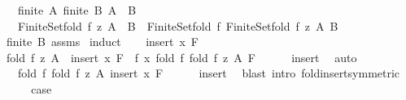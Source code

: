\begin{isabellebody}
\ \ \ {\isachardoublequoteopen}finite\ A{\isachardoublequoteclose}\ {\isachardoublequoteopen}finite\ B{\isachardoublequoteclose}\ {\isachardoublequoteopen}A\ {\isasyminter}\ B\ {\isacharequal}{\kern0pt}\ {\isacharbraceleft}{\kern0pt}{\isacharbraceright}{\kern0pt}{\isachardoublequoteclose}\isanewline
\ \ \ {\isachardoublequoteopen}Finite{\isacharunderscore}{\kern0pt}Set{\isachardot}{\kern0pt}fold\ f\ z\ {\isacharparenleft}{\kern0pt}A\ {\isasymunion}\ B{\isacharparenright}{\kern0pt}\ {\isacharequal}{\kern0pt}\ Finite{\isacharunderscore}{\kern0pt}Set{\isachardot}{\kern0pt}fold\ f\ {\isacharparenleft}{\kern0pt}Finite{\isacharunderscore}{\kern0pt}Set{\isachardot}{\kern0pt}fold\ f\ z\ A{\isacharparenright}{\kern0pt}\ B{\isachardoublequoteclose}\isanewline
%
\isadelimproof
\ \ %
\endisadelimproof
%
\isatagproof
{}\isamarkupfalse%
\ {\isacartoucheopen}finite\ B{\isacartoucheclose}\ assms{\isacharparenleft}{\kern0pt}{}{\isacharcomma}{\kern0pt}{}{\isacharcomma}{\kern0pt}{}{\isacharcomma}{\kern0pt}{}{\isacharparenright}{\kern0pt}\isanewline
{}\isamarkupfalse%
\ induct\isanewline
\ \ \isamarkupfalse%
\ {\isacharparenleft}{\kern0pt}insert\ x\ F{\isacharparenright}{\kern0pt}\isanewline
\ \ \isamarkupfalse%
\ {\isachardoublequoteopen}fold\ f\ z\ {\isacharparenleft}{\kern0pt}A\ {\isasymunion}\ insert\ x\ F{\isacharparenright}{\kern0pt}\ {\isacharequal}{\kern0pt}\ f\ x\ {\isacharparenleft}{\kern0pt}fold\ f\ {\isacharparenleft}{\kern0pt}fold\ f\ z\ A{\isacharparenright}{\kern0pt}\ F{\isacharparenright}{\kern0pt}{\isachardoublequoteclose}\isanewline
\ \ \ \ \isamarkupfalse%
\ insert\ \isamarkupfalse%
\ auto\isanewline
\ \ \isamarkupfalse%
\ \isamarkupfalse%
\ {\isachardoublequoteopen}{\isasymdots}\ {\isacharequal}{\kern0pt}\ fold\ f\ {\isacharparenleft}{\kern0pt}fold\ f\ z\ A{\isacharparenright}{\kern0pt}\ {\isacharparenleft}{\kern0pt}insert\ x\ F{\isacharparenright}{\kern0pt}{\isachardoublequoteclose}\isanewline
\ \ \ \ \isamarkupfalse%
\ insert\ \isamarkupfalse%
\ {\isacharparenleft}{\kern0pt}blast\ intro{\isacharcolon}{\kern0pt}\ fold{\isacharunderscore}{\kern0pt}insert{\isacharbrackleft}{\kern0pt}symmetric{\isacharbrackright}{\kern0pt}{\isacharparenright}{\kern0pt}\isanewline
\ \ \isamarkupfalse%
\ \isamarkupfalse%
\ {\isacharquery}{\kern0pt}case\ \isacommand{{\isachardot}{\kern0pt}}\isamarkupfalse%

\end{isabellebody}
